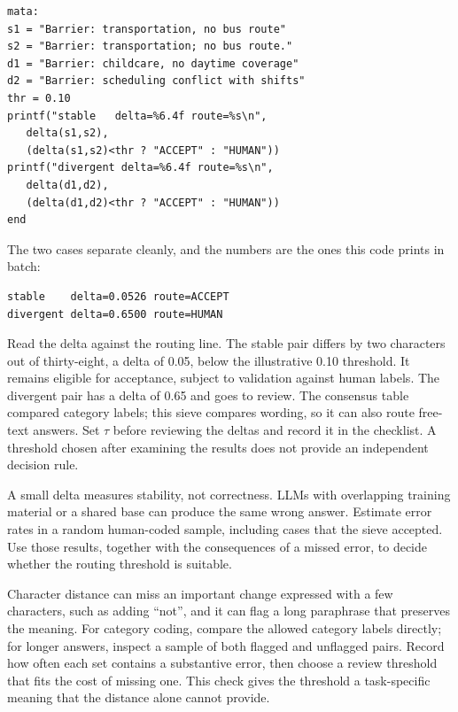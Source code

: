 \par
{\footnotesize
\begin{verbatim}
mata:
s1 = "Barrier: transportation, no bus route"
s2 = "Barrier: transportation; no bus route."
d1 = "Barrier: childcare, no daytime coverage"
d2 = "Barrier: scheduling conflict with shifts"
thr = 0.10
printf("stable   delta=%6.4f route=%s\n",
   delta(s1,s2),
   (delta(s1,s2)<thr ? "ACCEPT" : "HUMAN"))
printf("divergent delta=%6.4f route=%s\n",
   delta(d1,d2),
   (delta(d1,d2)<thr ? "ACCEPT" : "HUMAN"))
end
\end{verbatim}
}
The two cases separate cleanly, and the numbers are the ones this code prints in batch:
\par
{\footnotesize
\begin{verbatim}
stable    delta=0.0526 route=ACCEPT
divergent delta=0.6500 route=HUMAN
\end{verbatim}
}
Read the delta against the routing line. The stable pair differs by two characters out of thirty-eight, a delta of 0.05, below the illustrative 0.10 threshold. It remains eligible for acceptance, subject to validation against human labels. The divergent pair has a delta of 0.65 and goes to review. The consensus table compared category labels; this sieve compares wording, so it can also route free-text answers. Set $\tau$ before reviewing the deltas and record it in the checklist. A threshold chosen after examining the results does not provide an independent decision rule.

A small delta measures stability, not correctness. LLMs with overlapping training material or a shared base can produce the same wrong answer. Estimate error rates in a random human-coded sample, including cases that the sieve accepted. Use those results, together with the consequences of a missed error, to decide whether the routing threshold is suitable.

Character distance can miss an important change expressed with a few characters, such as adding \enquote{not}, and it can flag a long paraphrase that preserves the meaning. For category coding, compare the allowed category labels directly; for longer answers, inspect a sample of both flagged and unflagged pairs. Record how often each set contains a substantive error, then choose a review threshold that fits the cost of missing one. This check gives the threshold a task-specific meaning that the distance alone cannot provide.

